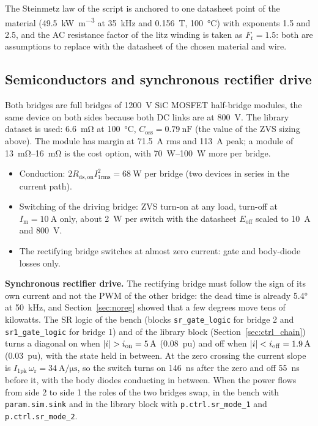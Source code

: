 \documentclass[12pt,a4paper]{scrartcl}
\newcommand{\ped}[1]{_{\mathrm{#1}}}
\newcommand{\code}[1]{\texttt{#1}}
\begin{document}
\begin{onehalfspace}
The Steinmetz law of the script is anchored to one datasheet point of the material (\SI{49.5}{\kilo\watt\per\cubic\metre} at \SI{35}{\kilo\hertz} and \SI{0.156}{\tesla}, \SI{100}{\celsius}) with exponents 1.5 and 2.5, and the AC resistance factor of the litz winding is taken as $F\ped{r} = 1.5$: both are assumptions to replace with the datasheet of the chosen material and wire.

\subsection{Semiconductors and synchronous rectifier drive}
\label{sec:semi}

Both bridges are full bridges of \SI{1200}{\volt} SiC MOSFET half-bridge modules, the same device on both sides because both DC links are at \SI{800}{\volt}. The library dataset  is used: \SI{6.6}{\milli\ohm} at \SI{100}{\celsius}, $C\ped{oss} = \SI{0.79}{\nano\farad}$ (the value of the ZVS sizing above). The module has margin at \SI{71.5}{\ampere} rms and \SI{113}{\ampere} peak; a module of \SIrange{13}{16}{\milli\ohm} is the cost option, with \SIrange{70}{100}{\watt} more per bridge.

\begin{itemize}[nosep]
	\item Conduction: $2 R\ped{ds,on} I\ped{1rms}^2 = \SI{68}{\watt}$ per bridge (two devices in series in the current path).
	\item Switching of the driving bridge: ZVS turn-on at any load, turn-off at $I\ped{m} = \SI{10}{\ampere}$ only, about \SI{2}{\watt} per switch with the datasheet $E\ped{off}$ scaled to \SI{10}{\ampere} and \SI{800}{\volt}.
	\item The rectifying bridge switches at almost zero current: gate and body-diode losses only.
\end{itemize}

\noindent\textbf{Synchronous rectifier drive.} The rectifying bridge must follow the sign of its own current and not the PWM of the other bridge: the dead time is already \ang{5.4} at \SI{50}{\kilo\hertz}, and Section~\ref{sec:noreg} showed that a few degrees move tens of kilowatts. The SR logic of the bench (blocks \code{sr\_gate\_logic} for bridge 2 and \code{sr1\_gate\_logic} for bridge 1) and of the library block (Section~\ref{sec:ctrl_chain}) turns a diagonal on when $\abs{i} > i\ped{on} = \SI{5}{\ampere}$ (\SI{0.08}{pu}) and off when $\abs{i} < i\ped{off} = \SI{1.9}{\ampere}$ (\SI{0.03}{pu}), with the state held in between. At the zero crossing the current slope is $I\ped{1pk}\,\omega\ped{r} = \SI{34}{\ampere\per\micro\second}$, so the switch turns on \SI{146}{\nano\second} after the zero and off \SI{55}{\nano\second} before it, with the body diodes conducting in between. When the power flows from side 2 to side 1 the roles of the two bridges swap, in the bench with \code{param.sim.sink} and in the library block with \code{p.ctrl.sr\_mode\_1} and \code{p.ctrl.sr\_mode\_2}.


\end{onehalfspace}
\end{document}
